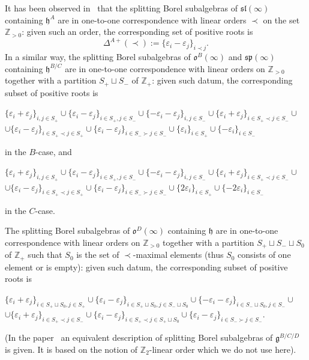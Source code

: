 \documentclass{emsprocart}
\begin{document}
It has been observed in~\cite{DP} that the splitting Borel subalgebras of $\mathfrak{sl}(\infty)$ containing $\mathfrak h^A$ are in one-to-one correspondence with linear orders $\prec$ on the set $\mathbb Z_{>0}$: given such an order, the corresponding set of positive roots is
$$\Delta^{A+}(\prec):=\{\varepsilon_i-\varepsilon_j\}_{i\prec j}.$$
In a similar way, the splitting Borel subalgebras of $\mathfrak o^B(\infty)$ and $\mathfrak{sp}(\infty)$ containing $\mathfrak h^{B/C}$ are in one-to-one correspondence with linear orders on $\mathbb Z_{>0}$ together with a partition $S_+\sqcup S_-$ of $\mathbb Z_+$: given such datum, the corresponding subset of positive roots is
\begin{center}$\{\varepsilon_i+\varepsilon_j\}_{i, j\in S_+}\cup\{\varepsilon_i-\varepsilon_j\}_{i\in S_+, j\in S_-}\cup\{-\varepsilon_i-\varepsilon_j\}_{i, j\in S_-}\cup\{\varepsilon_i+\varepsilon_j\}_{i\in S_+\prec j\in S_-}\cup$\\$\cup\{\varepsilon_i-\varepsilon_j\}_{i\in S_+\prec j\in S_+}\cup\{\varepsilon_i-\varepsilon_j\}_{i\in S_-\succ j\in S_-} \cup\{\varepsilon_i\}_{i\in S_+}\cup\{-\varepsilon_i\}_{i\in S_-}$\end{center} in the $B$-case, and\begin{center}$\{\varepsilon_i+\varepsilon_j\}_{i, j\in S_+}\cup\{\varepsilon_i-\varepsilon_j\}_{i\in S_+, j\in S_-}\cup\{-\varepsilon_i-\varepsilon_j\}_{i, j\in S_-}\cup\{\varepsilon_i+\varepsilon_j\}_{i\in S_+\prec j\in S_-}\cup$\\$\cup\{\varepsilon_i-\varepsilon_j\}_{i\in S_+\prec j\in S_+}\cup\{\varepsilon_i-\varepsilon_j\}_{i\in S_-\succ j\in S_-} \cup\{2\varepsilon_i\}_{i\in S_+}\cup\{-2\varepsilon_i\}_{i\in S_-}$\end{center} in the $C$-case.

The splitting Borel subalgebras of $\mathfrak o^D(\infty)$ containing $\mathfrak h$ are in one-to-one correspondence with linear orders on $\mathbb Z_{>0}$ together with a partition $S_+\sqcup S_-\sqcup S_0$ of $\mathbb Z_+$ such that $S_0$ is the set of $\prec$-maximal elements (thus $S_0$ consists of one element or is empty): given such datum, the corresponding subset of positive roots is \begin{center}$
\{\varepsilon_i+\varepsilon_j\}_{i\in S_+\sqcup S_0, j\in S_+}\cup\{\varepsilon_i-\varepsilon_j\}_{i\in S_+\sqcup S_0, j\in S_-\sqcup S_0}\cup\{-\varepsilon_i-\varepsilon_j\}_{i\in S_-\sqcup S_0, j\in S_-}\cup$\\$\cup\{\varepsilon_i+\varepsilon_j\}_{i\in S_+\prec j\in S_-}\cup \{\varepsilon_i-\varepsilon_j\}_{i\in S_+\prec j\in S_+\sqcup S_0}\cup\{\varepsilon_i-\varepsilon_j\}_{i\in S_-\succ j\in S_-}$.\end{center}
(In the paper~\cite[p.~229]{DP} an equivalent description of splitting Borel subalgebras of $\mathfrak g^{B/C/D}$ is given. It is based on the notion of $\mathbb Z_2$-linear order which we do not use here).
\end{document}

